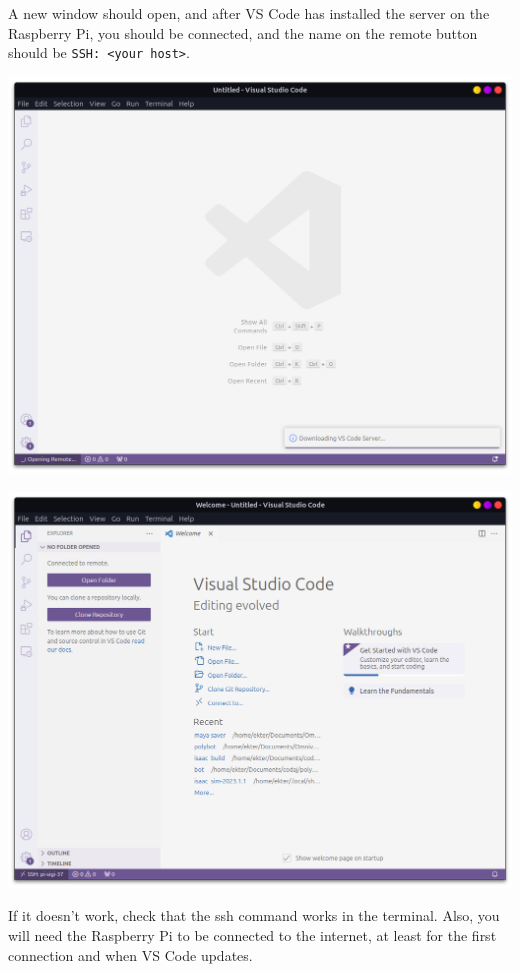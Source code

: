 \documentclass{article}
\begin{document}
A new window should open, and after VS Code has installed the server on the Raspberry Pi, you
should be connected, and the name on the remote button should be \texttt{SSH: <your host>}.

\includegraphics[scale=0.3]{img/vsc_ssh_connecting.png}

\includegraphics[scale=0.3]{img/vsc_ssh_connected.png}

If it doesn't work, check that the ssh command works in the terminal. Also, you will need the
Raspberry Pi to be connected to the internet, at least for the first connection and when VS Code
updates.
\end{document}
